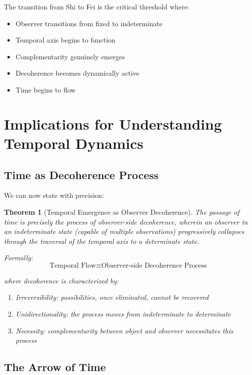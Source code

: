 \documentclass[12pt,a4paper]{article}
\newtheorem{theorem}[definition]{Theorem}
\begin{document}
The transition from Shi to Fei is the critical threshold where:

\begin{itemize}
    \item Observer transitions from fixed to indeterminate
    \item Temporal axis begins to function
    \item Complementarity genuinely emerges
    \item Decoherence becomes dynamically active
    \item Time begins to flow
\end{itemize}

\section{Implications for Understanding Temporal Dynamics}

\subsection{Time as Decoherence Process}

We can now state with precision:

\begin{theorem}[Temporal Emergence as Observer Decoherence]
The passage of time is precisely the process of observer-side decoherence, wherein an observer in an indeterminate state (capable of multiple observations) progressively collapses through the traversal of the temporal axis to a determinate state.

Formally:
\begin{equation}
\text{Temporal Flow} \equiv \text{Observer-side Decoherence Process}
\end{equation}

where decoherence is characterized by:
\begin{enumerate}
    \item Irreversibility: possibilities, once eliminated, cannot be recovered
    \item Unidirectionality: the process moves from indeterminate to determinate
    \item Necessity: complementarity between object and observer necessitates this process
\end{enumerate}
\end{theorem}

\subsection{The Arrow of Time}
\end{document}
